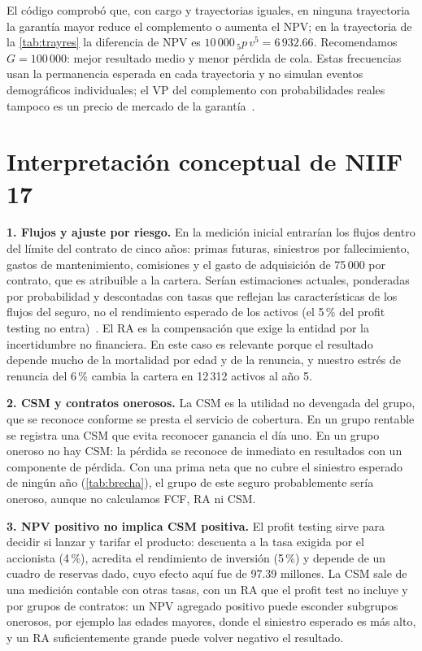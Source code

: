 \documentclass[10pt,a4paper]{article}
\numberwithin{equation}{section}
\begin{document}
	El código comprobó que, con cargo y trayectorias iguales, en ninguna trayectoria la garantía mayor reduce el complemento o aumenta el NPV; en la trayectoria de la \cref{tab:trayres} la diferencia de NPV es \(10\,000\,{}_5p\,v^5=6\,932.66\). Recomendamos \(G=100\,000\): mejor resultado medio y menor pérdida de cola. Estas frecuencias usan la permanencia esperada en cada trayectoria y no simulan eventos demográficos individuales; el VP del complemento con probabilidades reales tampoco es un precio de mercado de la garantía~\cite{Hardy2003}.

	\section{Interpretación conceptual de NIIF 17}\label{sec:F}

	\textbf{1. Flujos y ajuste por riesgo.} En la medición inicial entrarían los flujos dentro del límite del contrato de cinco años: primas futuras, siniestros por fallecimiento, gastos de mantenimiento, comisiones y el gasto de adquisición de 75\,000 por contrato, que es atribuible a la cartera. Serían estimaciones actuales, ponderadas por probabilidad y descontadas con tasas que reflejan las características de los flujos del seguro, no el rendimiento esperado de los activos (el 5\,\% del profit testing no entra)~\cite{NIIF17}. El RA es la compensación que exige la entidad por la incertidumbre no financiera. En este caso es relevante porque el resultado depende mucho de la mortalidad por edad y de la renuncia, y nuestro estrés de renuncia del 6\,\% cambia la cartera en 12\,312 activos al año 5.

	\textbf{2. CSM y contratos onerosos.} La CSM es la utilidad no devengada del grupo, que se reconoce conforme se presta el servicio de cobertura. En un grupo rentable se registra una CSM que evita reconocer ganancia el día uno. En un grupo oneroso no hay CSM: la pérdida se reconoce de inmediato en resultados con un componente de pérdida. Con una prima neta que no cubre el siniestro esperado de ningún año (\cref{tab:brecha}), el grupo de este seguro probablemente sería oneroso, aunque no calculamos FCF, RA ni CSM.

	\textbf{3. NPV positivo no implica CSM positiva.} El profit testing sirve para decidir si lanzar y tarifar el producto: descuenta a la tasa exigida por el accionista (4\,\%), acredita el rendimiento de inversión (5\,\%) y depende de un cuadro de reservas dado, cuyo efecto aquí fue de 97.39 millones. La CSM sale de una medición contable con otras tasas, con un RA que el profit test no incluye y por grupos de contratos: un NPV agregado positivo puede esconder subgrupos onerosos, por ejemplo las edades mayores, donde el siniestro esperado es más alto, y un RA suficientemente grande puede volver negativo el resultado.
\end{document}
